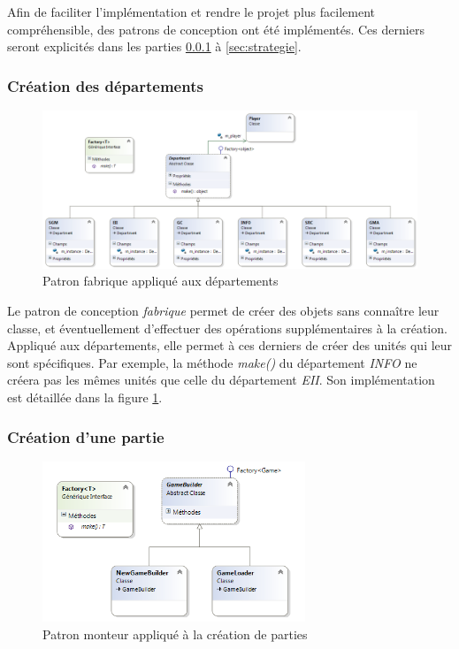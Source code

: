 Afin de faciliter l'implémentation et rendre le projet plus facilement compréhensible, des patrons de conception ont été implémentés.
Ces derniers seront explicités dans les parties \ref{sec:fabrique} à \ref{sec:strategie}.

\subsubsection{Création des départements} \label{sec:fabrique} %

\begin{figure}[!h]
\centering
\includegraphics[width=\textwidth]{Parties/Images/UML_Dept.png}
\caption{Patron fabrique appliqué aux départements}
\label{fig:uml_dept}
\end{figure}

Le patron de conception \emph{fabrique} permet de créer des objets sans connaître leur classe, et éventuellement d'effectuer des opérations supplémentaires à la création.
Appliqué aux départements, elle permet à ces derniers de créer des unités qui leur sont spécifiques.
Par exemple, la méthode \emph{make()} du département \emph{INFO} ne créera pas les mêmes unités que celle du département \emph{EII}.
Son implémentation est détaillée dans la figure \ref{fig:uml_dept}.

\subsubsection{Création d'une partie} \label{sec:monteur} %

\begin{figure}[!h]
\centering
\includegraphics[width=0.7\textwidth]{Parties/Images/UML_Game.png}
\caption{Patron monteur appliqué à la création de parties}
\label{fig:uml_game}
\end{figure}

